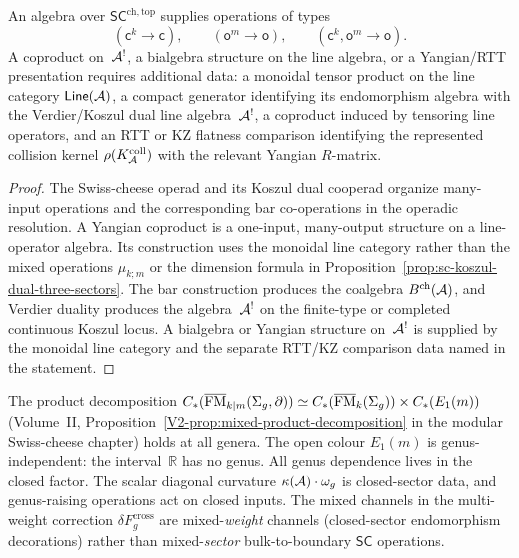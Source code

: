 \begin{proposition}
\label{prop:thqg-swiss-cheese-no-yangian-coproduct}
An algebra over $\mathsf{SC}^{\mathrm{ch,top}}$ supplies operations
of types
\[
(\mathsf{c}^k\to\mathsf{c}),\qquad
(\mathsf{o}^m\to\mathsf{o}),\qquad
(\mathsf{c}^k,\mathsf{o}^m\to\mathsf{o}).
\]
A coproduct on~$\mathcal{A}^!$, a bialgebra structure on the line algebra,
or a Yangian/RTT presentation requires additional data: a monoidal
tensor product on the line category $\mathsf{Line}(\mathcal{A})$, a compact
generator identifying its endomorphism algebra with the
Verdier/Koszul dual line algebra~$\mathcal{A}^!$, a coproduct induced by
tensoring line operators, and an RTT or KZ flatness comparison
identifying the represented collision kernel
$\rho(K_{\mathcal{A}}^{\mathrm{coll}})$ with the relevant Yangian $R$-matrix.
\end{proposition}

\begin{proof}
The Swiss-cheese operad and its Koszul dual cooperad organize
many-input operations and the corresponding bar co-operations in the
operadic resolution. A Yangian coproduct is a one-input,
many-output structure on a line-operator algebra. Its construction
uses the monoidal line category rather than the mixed operations
$\mu_{k;m}$ or the dimension formula in
Proposition~\ref{prop:sc-koszul-dual-three-sectors}. The bar
construction produces the coalgebra $B^{\mathrm{ch}}(\mathcal{A})$, and
Verdier duality produces the algebra~$\mathcal{A}^!$ on the finite-type or
completed continuous Koszul locus. A bialgebra or Yangian structure
on~$\mathcal{A}^!$ is supplied by the monoidal line category and the
separate RTT/KZ comparison data named in the statement.
\end{proof}

\begin{remark}
\label{rem:mixed-sector-genus-independent}
The product decomposition
$C_*(\overline{\operatorname{FM}}_{k|m}(\Sigma_g, \partial))
\simeq C_*(\overline{\operatorname{FM}}_k(\Sigma_g)) \times C_*(E_1(m))$
(Volume~II, Proposition~\ref{V2-prop:mixed-product-decomposition} in the
modular Swiss-cheese chapter) holds at all genera.
The open colour $E_1(m)$ is genus-independent: the interval~$\mathbb{R}$
has no genus. All genus dependence lives in the closed factor. The
scalar diagonal curvature $\kappa(\mathcal{A}) \cdot \omega_g$ is closed-sector data, and
genus-raising operations act on closed inputs. The mixed channels in
the multi-weight correction
$\delta F_g^{\mathrm{cross}}$ are mixed-\emph{weight} channels
\textup{(}closed-sector endomorphism decorations\textup{)} rather
than mixed-\emph{sector} bulk-to-boundary $\mathsf{SC}$ operations.
\end{remark}

